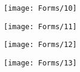 \begin{figure}[h!]
    \centering
    \texttt{[image: Forms/10]}
\end{figure}

\begin{figure}[h!]
    \centering
    \texttt{[image: Forms/11]}
\end{figure}

\begin{figure}[h!]
    \centering
    \texttt{[image: Forms/12]}
\end{figure}

\begin{figure}[h!]
    \centering
    \texttt{[image: Forms/13]}
\end{figure}


